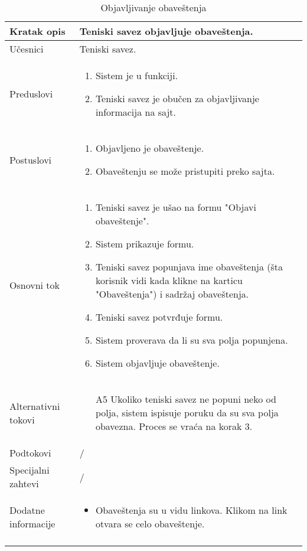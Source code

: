 \documentclass{article}
\begin{document}
    \begin{longtable}{| p{} | p{} |} 
        \hline
            Kratak opis & Teniski savez objavljuje obaveštenja.\\ 
        \hline    
            Učesnici & Teniski savez.\\
        \hline
            Preduslovi & 
                \begin{enumerate}
                    \item Sistem je u funkciji.
                    \item Teniski savez je obučen za objavljivanje informacija na sajt.
                \end{enumerate}\\
        \hline  
            Postuslovi & 
                \begin{enumerate}
                    \item Objavljeno je obaveštenje.
                    \item Obaveštenju se može pristupiti preko sajta.
                \end{enumerate}\\
        \hline
            Osnovni tok & 
                \begin{enumerate}
                    \item Teniski savez je ušao na formu "Objavi obaveštenje".
                    \item Sistem prikazuje formu.
                    \item Teniski savez popunjava ime obaveštenja (šta korisnik vidi kada klikne na karticu "Obaveštenja") i sadržaj obaveštenja.
                    \item Teniski savez potvrđuje formu.
                    \item Sistem proverava da li su sva polja popunjena.
                    \item Sistem objavljuje obaveštenje.
                \end{enumerate}\\
        \hline
            Alternativni tokovi & 
                \begin{itemize}
                    \item[A5] Ukoliko teniski savez ne popuni neko od polja, sistem ispisuje poruku da su sva polja obavezna. Proces se vraća na korak 3.
                \end{itemize}\\
        \hline
            Podtokovi & /\\
        \hline
            Specijalni zahtevi & /\\
        \hline
            Dodatne informacije & 
                \begin{itemize}
                    \item Obaveštenja su u vidu linkova. Klikom na link otvara se celo obaveštenje.
                \end{itemize}\\
        \hline    
        \caption{Objavljivanje obaveštenja}
    \end{longtable}
\end{document}
